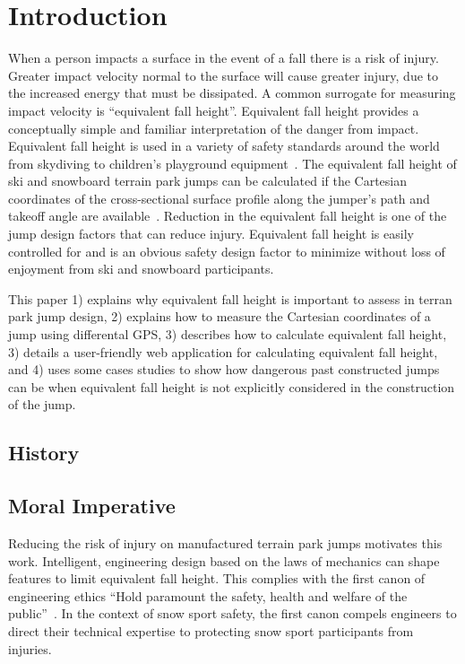 \documentclass{article}
\begin{document}
\begin{abstract}
\end{abstract}

\section{Introduction}
%
When a person impacts a surface in the event of a fall there is a risk of
injury. Greater impact velocity normal to the surface will cause greater
injury, due to the increased energy that must be dissipated. A common surrogate
for measuring impact velocity is ``equivalent fall height''.  Equivalent fall
height provides a conceptually simple and familiar interpretation of the danger
from impact. Equivalent fall height is used in a variety of safety standards
around the world from skydiving to children's playground
equipment~\cite{Chalmers1996}. The equivalent fall height of ski and snowboard
terrain park jumps can be calculated if the Cartesian coordinates of the
cross-sectional surface profile along the jumper's path and takeoff angle are
available~\cite{Hubbard2012}. Reduction in the equivalent fall height is one of
the jump design factors that can reduce injury. Equivalent fall height is
easily controlled for and is an obvious safety design factor to minimize
without loss of enjoyment from ski and snowboard participants.

This paper 1) explains why equivalent fall height is important to assess in
terran park jump design, 2) explains how to measure the Cartesian coordinates
of a jump using differental GPS, 3) describes how to calculate equivalent fall
height, 3) details a user-friendly web application for calculating equivalent
fall height, and 4) uses some cases studies to show how dangerous past
constructed jumps can be when equivalent fall height is not explicitly
considered in the construction of the jump.

\subsection{History}
%

\subsection{Moral Imperative}
%
Reducing the risk of injury on manufactured terrain park jumps motivates this
work. Intelligent, engineering design based on the laws of mechanics can shape
features to limit equivalent fall height. This complies with the first canon of
engineering ethics ``Hold paramount the safety, health and welfare of the
public''~\cite{NSPE2019}. In the context of snow sport safety, the first canon
compels engineers to direct their technical expertise to protecting snow sport
participants from injuries.
\end{document}
